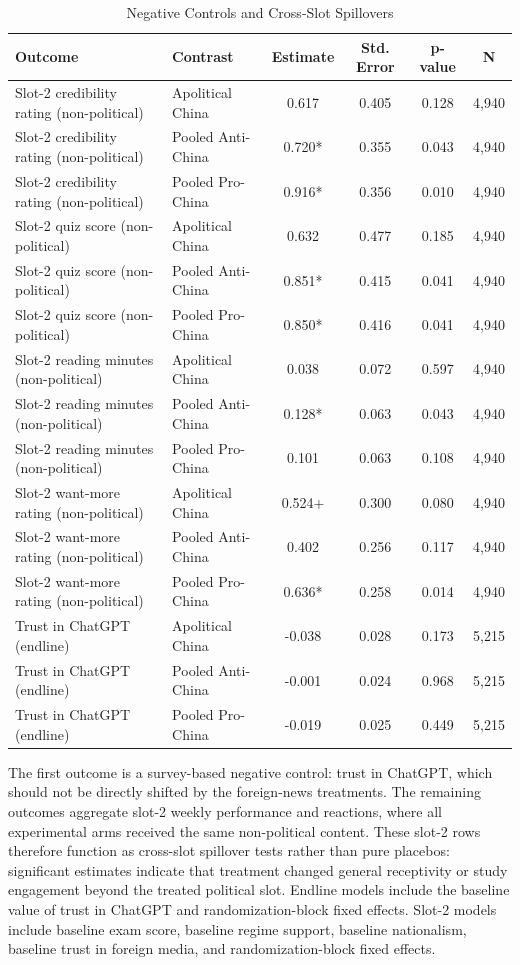 \begin{table}[H]
\centering
\caption{Negative Controls and Cross-Slot Spillovers}
\label{tab:negative_controls}
\footnotesize
\begin{threeparttable}
\begin{tabular}{llcccc}
\toprule
Outcome & Contrast & Estimate & Std. Error & p-value & N \\
\midrule
Slot-2 credibility rating (non-political) & Apolitical China & 0.617 & 0.405 & 0.128 & 4,940 \\
Slot-2 credibility rating (non-political) & Pooled Anti-China & 0.720* & 0.355 & 0.043 & 4,940 \\
Slot-2 credibility rating (non-political) & Pooled Pro-China & 0.916* & 0.356 & 0.010 & 4,940 \\
Slot-2 quiz score (non-political) & Apolitical China & 0.632 & 0.477 & 0.185 & 4,940 \\
Slot-2 quiz score (non-political) & Pooled Anti-China & 0.851* & 0.415 & 0.041 & 4,940 \\
Slot-2 quiz score (non-political) & Pooled Pro-China & 0.850* & 0.416 & 0.041 & 4,940 \\
Slot-2 reading minutes (non-political) & Apolitical China & 0.038 & 0.072 & 0.597 & 4,940 \\
Slot-2 reading minutes (non-political) & Pooled Anti-China & 0.128* & 0.063 & 0.043 & 4,940 \\
Slot-2 reading minutes (non-political) & Pooled Pro-China & 0.101 & 0.063 & 0.108 & 4,940 \\
Slot-2 want-more rating (non-political) & Apolitical China & 0.524+ & 0.300 & 0.080 & 4,940 \\
Slot-2 want-more rating (non-political) & Pooled Anti-China & 0.402 & 0.256 & 0.117 & 4,940 \\
Slot-2 want-more rating (non-political) & Pooled Pro-China & 0.636* & 0.258 & 0.014 & 4,940 \\
Trust in ChatGPT (endline) & Apolitical China & -0.038 & 0.028 & 0.173 & 5,215 \\
Trust in ChatGPT (endline) & Pooled Anti-China & -0.001 & 0.024 & 0.968 & 5,215 \\
Trust in ChatGPT (endline) & Pooled Pro-China & -0.019 & 0.025 & 0.449 & 5,215 \\
\bottomrule
\end{tabular}
\begin{tablenotes}[flushleft]
\footnotesize
\item The first outcome is a survey-based negative control: trust in ChatGPT, which should not be directly shifted by the foreign-news treatments. The remaining outcomes aggregate slot-2 weekly performance and reactions, where all experimental arms received the same non-political content. These slot-2 rows therefore function as cross-slot spillover tests rather than pure placebos: significant estimates indicate that treatment changed general receptivity or study engagement beyond the treated political slot. Endline models include the baseline value of trust in ChatGPT and randomization-block fixed effects. Slot-2 models include baseline exam score, baseline regime support, baseline nationalism, baseline trust in foreign media, and randomization-block fixed effects.

\end{tablenotes}
\end{threeparttable}
\end{table}
